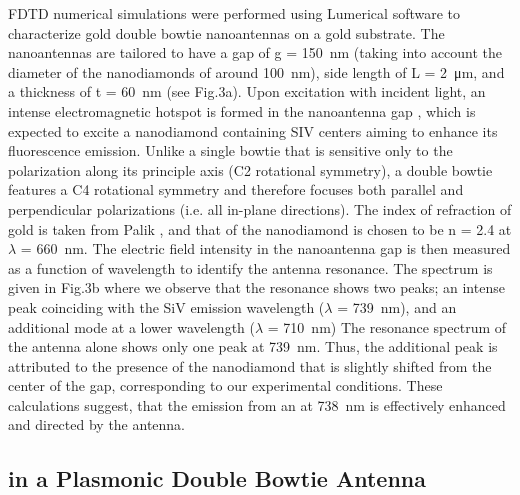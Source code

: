 	FDTD numerical simulations were performed using Lumerical software to characterize gold double bowtie nanoantennas on a gold substrate. The nanoantennas are tailored to have a gap of g = \SI{150}{nm} (taking into account the diameter of the nanodiamonds of around \SI{100}{nm}), side length of L = \SI{2}{\micro\meter}, and a thickness of t = \SI{60}{nm} (see Fig.3a). 
	Upon excitation with incident light, an intense electromagnetic hotspot is formed in the nanoantenna gap \cite{Rahbany2015}, which is expected to excite a nanodiamond containing SIV centers aiming to enhance its fluorescence emission. 
	Unlike a single bowtie that is sensitive only to the polarization along its principle axis (C2 rotational symmetry), a double bowtie features a C4 rotational symmetry and therefore focuses both parallel and perpendicular polarizations (i.e. all in-plane directions).
	The index of refraction of gold is taken from Palik \cite{}, and that of the nanodiamond is chosen to be n = 2.4 at $\lambda$ = \SI{660}{nm}. 
	The electric field intensity in the nanoantenna gap is then measured as a function of wavelength to identify the antenna resonance. 
	The spectrum is given in Fig.3b where we observe that the resonance shows two peaks; an intense peak coinciding with the SiV emission wavelength ($\lambda$ = \SI{739}{nm}), and an additional mode at a lower wavelength ($\lambda$ = \SI{710}{nm}) \cite{Rahbany2016}
	The resonance spectrum of the antenna alone shows only one peak at \SI{739}{nm}. 
	Thus, the additional peak is attributed to the presence of the nanodiamond that is slightly shifted from the center of the gap, corresponding to our experimental conditions.
	These calculations suggest, that the emission from an \siv at \SI{738}{nm} is effectively enhanced and directed by the antenna.

	\subsection{\siv in a Plasmonic Double Bowtie Antenna}

